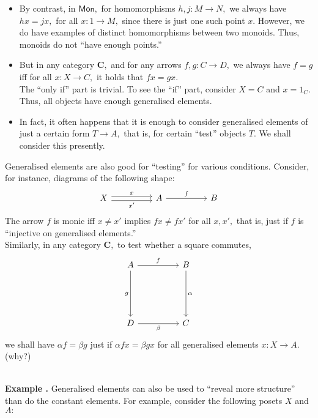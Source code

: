 \documentclass[11pt,leqno,landscape,semhelv]{seminar}
\numberwithin{equation}{section}
\theoremstyle{definition}
\numberwithin{thm}{section}
\numberwithin{equation}{section}
\newcommand{\example}[1]{\refstepcounter{thm}\par\medskip
   {\textbf{Example \thethm.} #1} \rmfamily}
\begin{document}
\begin{enumerate}
\begin{itemize}
	\item By contrast, in $\mathsf{Mon},$ for homomorphisms $h, j: M \to N,$ we always have $hx = jx,$ for all $x:1 \to M,$ since there is just one such point $x.$ However, we do have examples of distinct homomorphisms between two monoids. Thus, monoids do not ``have enough points.''
	\item But in any category $\mathbf{C},$ and for any arrows $f, g:C\to D,$ we always have $f = g$ iff for all $x:X\to C,$ it holds that $fx = gx.$\\
	The ``only if'' part is trivial. To see the ``if'' part, consider $X = C$ and $x = 1_C.$\\
	Thus, all objects have enough generalised elements.
	\item In fact, it often happens that it is enough to consider generalised elements of just a certain form $T \to A,$ that is, for certain ``test'' objects $T.$ We shall consider this presently.
\end{itemize}
Generalised elements are also good for ``testing'' for various conditions. Consider, for instance, diagrams of the following shape:
\begin{equation*} 
	\begin{tikzcd}
		X \arrow[rr, "x", shift left = 1] \arrow[rr, "x'"', shift right = 1] && A \arrow[rr, "f"] && B 
	\end{tikzcd}
\end{equation*}
The arrow $f$ is monic iff $x \neq x'$ implies $fx \neq fx'$ for all $x, x',$ that is, just if $f$ is ``injective on generalised elements.''\\
Similarly, in any category $\mathbf{C},$ to test whether a square commutes,
\begin{equation*} 
	\begin{tikzcd}
	A \arrow[rr, "f"] \arrow[ddd, "g"'] &  & B \arrow[ddd, "\alpha"] \\&&\\&&\\D \arrow[rr, "\beta"']&&C
	\end{tikzcd}
\end{equation*}	
we shall have $\alpha f = \beta g$ just if $\alpha fx = \beta gx$ for all generalised elements $x:X \to A.$ (why?)\\\\
\end{enumerate}
\example{} Generalised elements can also be used to ``reveal more structure'' than do the constant elements. For example, consider the following posets $X$ and $A:$
\end{document}
